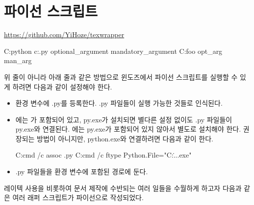 

\chapter{파이선 스크립트}

\begin{flushright}
\url{https://github.com/YiHoze/texwrapper}
\end{flushright}

\begin{code}
C:\>python c:\home\bin\foo.py optional_argument mandatory_argument
C:\>foo opt_arg man_arg
\end{code}

위 줄이 아니라 아래 줄과 같은 방법으로 윈도즈에서 파이선 스크립트를 실행할 수 있게 하려면 다음과 같이 설정해야 한다.

\begin{itemize}

\item {} 환경 변수에 .py를 등록한다. .py 파일들이 실행 가능한 것들로 인식된다.

\item {}에는 가 포함되어 있고, py.exe가 설치되면 별다른 설정 없이도 .py 파일들이 py.exe와 연결된다. 
에는 py.exe가 포함되어 있지 않아서 별도로 설치해야 한다.
권장되는 방법이 아니지만, python.exe와 연결하려면 다음과 같이 한다.

\begin{code}
C:\>cmd /c assoc .py
C:\>cmd /c ftype Python.File="C:\Users\...\python.exe" %
\end{code}

\item .py 파일들을  환경 변수에 포함된 경로에 둔다.

\end{itemize}

레이텍 사용을 비롯하여 문서 제작에 수반되는 여러 일들을 수월하게 하고자 다음과 같은 여러 래퍼 스크립트가 파이선으로 작성되었다.

